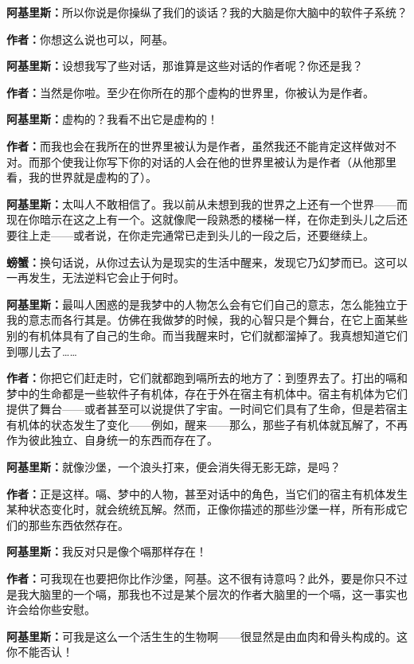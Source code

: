 \documentclass[
  12pt,
  twoside,
  openright,
  oldfontcommands,
]{memoir}
\newcommand{\dialogname}[1]{{\heifamily\bfseries #1}}
\begin{document}
\dialogname{阿基里斯：}所以你说是你操纵了我们的谈话？我的大脑是你大脑中的软件子系统？

\dialogname{作者：}你想这么说也可以，阿基。

\dialogname{阿基里斯：}设想我写了些对话，那谁算是这些对话的作者呢？你还是我？

\dialogname{作者：}当然是你啦。至少在你所在的那个虚构的世界里，你被认为是作者。

\dialogname{阿基里斯：}虚构的？我看不出它是虚构的！

\dialogname{作者：}而我也会在我所在的世界里被认为是作者，虽然我还不能肯定这样做对不对。而那个使我让你写下你的对话的人会在他的世界里被认为是作者（从他那里看，我的世界就是虚构的了）。

\dialogname{阿基里斯：}太叫人不敢相信了。我以前从未想到我的世界之上还有一个世界------而现在你暗示在这之上有一个。这就像爬一段熟悉的楼梯一样，在你走到头儿之后还要往上走------或者说，在你走完通常已走到头儿的一段之后，还要继续上。

\dialogname{螃蟹：}换句话说，从你过去认为是现实的生活中醒来，发现它乃幻梦而已。这可以一再发生，无法逆料它会止于何时。

\dialogname{阿基里斯：}最叫人困惑的是我梦中的人物怎么会有它们自己的意志，怎么能独立于我的意志而各行其是。仿佛在我做梦的时候，我的心智只是个舞台，在它上面某些别的有机体具有了自己的生命。而当我醒来时，它们就都溜掉了。我真想知道它们到哪儿去了\ldots\ldots{}

\dialogname{作者：}你把它们赶走时，它们就都跑到嗝所去的地方了：到堕界去了。打出的嗝和梦中的生命都是一些软件子有机体，存在于外在宿主有机体中。宿主有机体为它们提供了舞台------或者甚至可以说提供了宇宙。一时间它们具有了生命，但是若宿主有机体的状态发生了变化------例如，醒来------那么，那些子有机体就瓦解了，不再作为彼此独立、自身统一的东西而存在了。

\dialogname{阿基里斯：}就像沙堡，一个浪头打来，便会消失得无影无踪，是吗？

\dialogname{作者：}正是这样。嗝、梦中的人物，甚至对话中的角色，当它们的宿主有机体发生某种状态变化时，就会统统瓦解。然而，正像你描述的那些沙堡一样，所有形成它们的那些东西依然存在。

\dialogname{阿基里斯：}我反对只是像个嗝那样存在！

\dialogname{作者：}可我现在也要把你比作沙堡，阿基。这不很有诗意吗？此外，要是你只不过是我大脑里的一个嗝，那我也不过是某个层次的作者大脑里的一个嗝，这一事实也许会给你些安慰。

\dialogname{阿基里斯：}可我是这么一个活生生的生物啊------很显然是由血肉和骨头构成的。这你不能否认！
\end{document}
